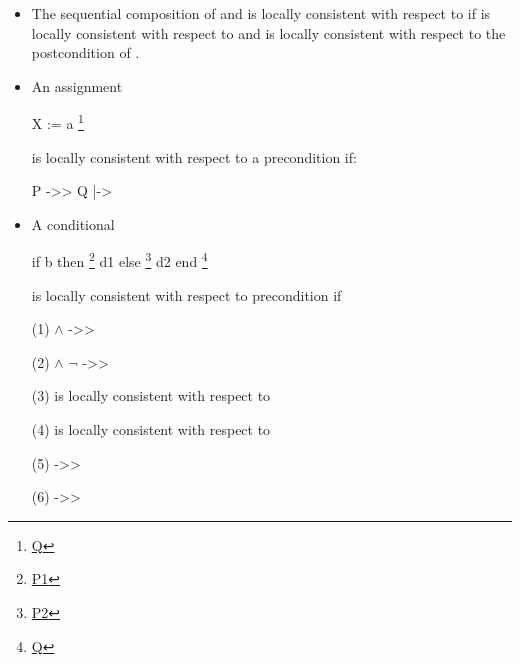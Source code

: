 \documentclass[12pt]{report}
\begin{document}
\begin{itemize}
\item  The sequential composition of  and  is locally
      consistent with respect to  if  is locally consistent with
      respect to  and  is locally consistent with respect to
      the postcondition of . 
\end{itemize}



\begin{itemize}
\item  An assignment


        X := a \footnote{\url{Q}}


      is locally consistent with respect to a precondition  if:


        P ->> Q  |-> 

\end{itemize}



\begin{itemize}
\item  A conditional


        if b then \footnote{\url{P1}} d1 else \footnote{\url{P2}} d2 end \footnote{\url{Q}}


      is locally consistent with respect to precondition  if


         (1)  \ensuremath{\land}  ->> 


         (2)  \ensuremath{\land} \ensuremath{\lnot} ->> 


         (3)  is locally consistent with respect to 


         (4)  is locally consistent with respect to 


         (5)   ->> 


         (6)   ->> 

\end{itemize}
\end{document}
